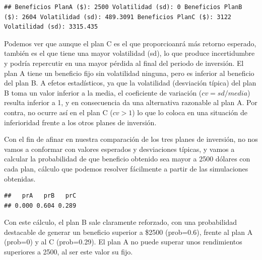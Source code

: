 \documentclass[
]{book}
\newenvironment{Shaded}{\begin{snugshade}}{\end{snugshade}}
\newcommand{\AttributeTok}[1]{\textcolor[rgb]{0.77,0.63,0.00}{#1}}
\newcommand{\CommentTok}[1]{\textcolor[rgb]{0.56,0.35,0.01}{\textit{#1}}}
\newcommand{\DecValTok}[1]{\textcolor[rgb]{0.00,0.00,0.81}{#1}}
\newcommand{\FunctionTok}[1]{\textcolor[rgb]{0.00,0.00,0.00}{#1}}
\newcommand{\NormalTok}[1]{#1}
\newcommand{\SpecialCharTok}[1]{\textcolor[rgb]{0.00,0.00,0.00}{#1}}
\theoremstyle{definition}
\theoremstyle{definition}
\theoremstyle{definition}
\theoremstyle{definition}
\theoremstyle{remark}
\begin{document}
\begin{verbatim}
## Beneficios PlanA ($): 2500 Volatilidad (sd): 0 Beneficios PlanB ($): 2604 Volatilidad (sd): 489.3091 Beneficios PlanC ($): 3122 Volatilidad (sd): 3315.435
\end{verbatim}

Podemos ver que aunque el plan C es el que proporcioanrá más retorno esperado, también es el que tiene una mayor volatilidad (sd), lo que produce incertidumbre y podría repercutir en una mayor pérdida al final del periodo de inversión. El plan A tiene un beneficio fijo sin volatilidad ninguna, pero es inferior al beneficio del plan B. A efetos estadísticos, ya que la volatilidad (desviación típica) del plan B toma un valor inferior a la media, el coeficiente de variación (\(cv=sd/media\)) resulta inferior a 1, y en consecuencia da una alternativa razonable al plan A. Por contra, no ocurre así en el plan C (\(cv>1\)) lo que lo coloca en una situación de inferioridad frente a los otros planes de inversión.

Con el fin de afinar en nuestra comparación de los tres planes de inversión, no nos vamos a conformar con valores esperados y desviaciones típicas, y vamos a calcular la probabilidad de que beneficio obtenido sea mayor a 2500 dólares con cada plan, cálculo que podemos resolver fácilmente a partir de las simulaciones obtenidas.

\begin{Shaded}
\end{Shaded}

\begin{verbatim}
##   prA   prB   prC 
## 0.000 0.604 0.289
\end{verbatim}

Con este cálculo, el plan B sale claramente reforzado, con una probabilidad destacable de generar un beneficio superior a \$2500 (prob=0.6), frente al plan A (prob=0) y al C (prob=0.29). El plan A no puede superar unos rendimientos superiores a 2500, al ser este valor su fijo.
\end{document}
